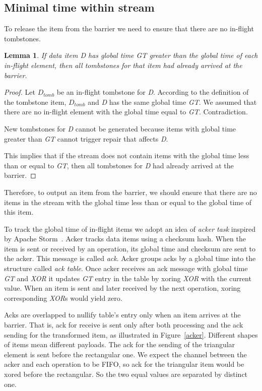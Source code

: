 \subsection{Minimal time within stream}

To release the item from the barrier we need to ensure that there are no in-flight tombstones. 

\newtheorem{minimal-time-claim}{Lemma}

\begin{minimal-time-claim}
  If data item {\it D} has global time {\it GT} greater than the global time of each in-flight element, then all tombstones for that item had already arrived at the barrier.
\end{minimal-time-claim}

\begin{proof}
  Let $D_{tomb}$ be an in-flight tombstone for {\it D}. According to the definition of the tombstone item, $D_{tomb}$ and {\it D} has the same global time {\it GT}. We assumed that there are no in-flight element with the global time equal to {\it GT}. Contradiction.
  
  New tombstones for {\it D} cannot be generated because items with global time greater than {\it GT} cannot trigger repair that affects {\it D}.

  This implies that if the stream does not contain items with the global time less than or equal to {\it GT}, then all tombstones for {\it D} had already arrived at the barrier. 
\end{proof}

Therefore, to output an item from the barrier, we should ensure that there are no items in the stream with the global time less than or equal to the global time of this item.

To track the global time of in-flight items we adopt an idea of {\it acker task} inspired by Apache Storm~\cite{apache:storm}. Acker tracks data items using a checksum hash. When the item is sent or received by an operation, its global time and checksum are sent to the acker. This message is called {\it ack}. Acker groups acks by a global time into the structure called {\it ack table}. Once acker receives an ack message with global time {\it GT} and {\it XOR} it updates {\it GT} entry in the table by xoring {\it XOR} with the current value. When an item is sent and later received by the next operation, xoring corresponding {\it XOR}s would yield zero.

Acks are overlapped to nullify table's entry only when an item arrives at the barrier. That is, ack for receive is sent only after both processing and the ack sending for the transformed item, as illustrated in Figure~\ref{acker}. Different shapes of items mean different payloads. The ack for the sending of the triangular element is sent before the rectangular one. We expect the channel between the acker and each operation to be FIFO, so ack for the triangular item would be xored before the rectangular. So the two equal values are separated by distinct one. 

